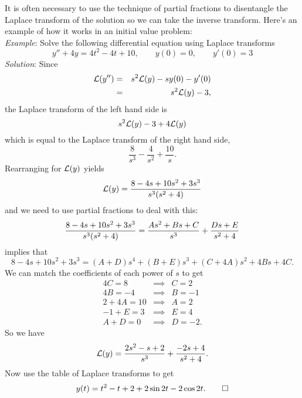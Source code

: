 \documentclass[10pt,driverfallback=hypertex]{report}
\begin{document}
It is often necessary to use the technique of partial fractions to disentangle
the Laplace transform of the solution so we can take the inverse transform.
Here's an example of how it works in an initial value problem:\\
\noindent\emph{Example}:
Solve the following differential equation using Laplace transforms
\begin{equation*}
  y'' + 4y = 4 t^2 - 4t +10, \qquad y(0) = 0, \qquad y'(0)=3
\end{equation*}
\noindent\emph{Solution}:
Since
\begin{eqnarray*}
\mathcal{L}(y'') &=& s^{2} \mathcal{L}(y)-sy(0)-y'(0)\\
          &=& s^{2} \mathcal{L}(y)-3,
\end{eqnarray*}
the Laplace transform of the left hand side is
\begin{equation*}
 s^{2} \mathcal{L}(y)-3 + 4 \mathcal{L}(y)
\end{equation*}
which is equal to the Laplace transform of the right hand side,
\begin{equation*}
 \frac{8}{s^3} - \frac{4}{s^2} + \frac{10}{s}.
\end{equation*}
Rearranging for $\mathcal{L}(y)$ yields
\begin{eqnarray*}
  \mathcal{L}(y) = \frac{8 - 4s +10 s^2 + 3s^3}{s^{3}(s^{2}+4)}
\end{eqnarray*}
and we need to use partial fractions to deal with this:
\begin{dmath*}
\frac{8 - 4s +10 s^2 + 3s^3}{s^{3}(s^{2}+4)}
= \frac{As^2 + Bs + C}{s^3} + \frac{Ds +E}{s^2 + 4} \\
\end{dmath*}
implies that
\begin{dmath*}
  8 -4s +10s^2 +3s^3 = (A+D)s^4 + (B+E)s^3 +(C+4A)s^2 + 4Bs +4C.
\end{dmath*}
We can match the coefficients of each power of $s$ to get
\begin{eqnarray*}
4C=8 &\implies& C=2\\
4B=-4 &\implies& B=-1\\
2 + 4A = 10 &\implies& A=2\\
-1+E=3 &\implies& E=4\\
A+D=0 &\implies& D=-2.
\end{eqnarray*}
So we have
\begin{eqnarray*}
\mathcal{L}(y) = \frac{2s^2 - s + 2}{s^3} + \frac{-2s +4}{s^2 + 4}.
\end{eqnarray*}
Now use the table of Laplace transforms to get
\begin{eqnarray*}
y(t) = t^2 -t +2 +2 \sin{2t} - 2 \cos{2t}. \qed
\end{eqnarray*}
\end{document}
